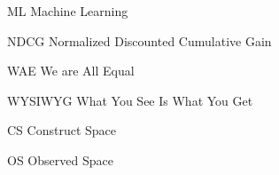 \begin{abbreviations}
\item[ML] Machine Learning
\item[NDCG] Normalized Discounted Cumulative Gain
\item[WAE] We are All Equal
\item[WYSIWYG] What You See Is What You Get
\item[CS] Construct Space
\item[OS] Observed Space
\end{abbreviations}

